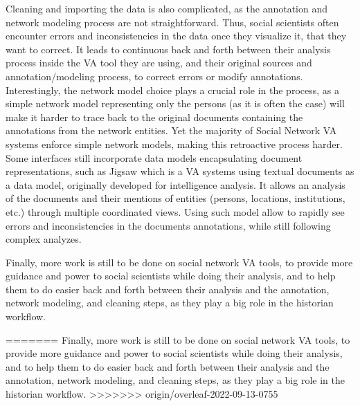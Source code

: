 Cleaning and importing the data is also complicated, as the annotation and network modeling process are not straightforward.
Thus, social scientists often encounter errors and inconsistencies in the data once they visualize it, that they want to correct.
It leads to continuous back and forth between their analysis process inside the VA tool they are using, and their original sources and annotation/modeling process, to correct errors or modify annotations.
Interestingly, the network model choice plays a crucial role in the process, as a simple network model representing only the persons (as it is often the case) will make it harder to trace back to the original documents containing the annotations from the network entities.
Yet the majority of Social Network VA systems enforce simple network models, making this retroactive process harder.
Some interfaces still incorporate data models encapsulating document representations, such as Jigsaw \cite{staskoJigsawSupportingInvestigative2008} which is a VA systems using textual documents as a data model, originally developed for intelligence analysis.
It allows an analysis of the documents and their mentions of entities (persons, locations, institutions, etc.) through multiple coordinated views.
Using such model allow to rapidly see errors and inconsistencies in the documents annotations, while still following complex analyzes.

Finally, more work is still to be done on social network VA tools, to provide more guidance and power to social scientists while doing their analysis, and to help them to do easier back and forth between their analysis and the annotation, network modeling, and cleaning steps, as they play a big role in the historian workflow.

































=======
Finally, more work is still to be done on social network VA tools, to provide more guidance and power to social scientists while doing their analysis, and to help them to do easier back and forth between their analysis and the annotation, network modeling, and cleaning steps, as they play a big role in the historian workflow.
>>>>>>> origin/overleaf-2022-09-13-0755
